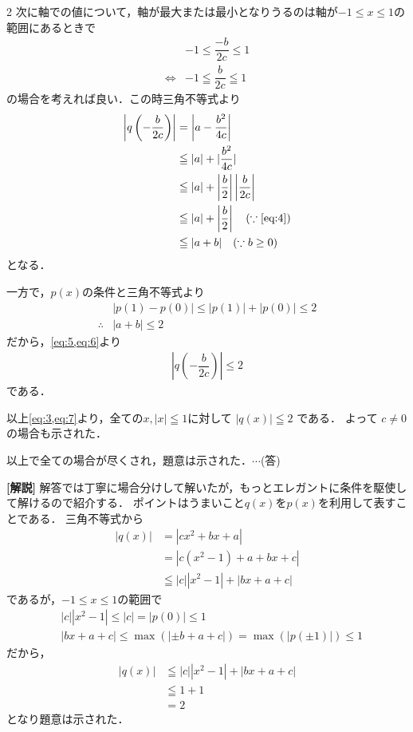 \documentclass[../../main.tex]{subfiles}
\begin{document}
\begin{multicols}{2}
  次に軸での値について，軸が最大または最小となりうるのは軸が$-1\le x\le 1$の範囲にあるときで
  \begin{align}
    & -1 \le \dfrac{-b}{2c} \le 1                        \\
    \iff
    & -1 \leqq \dfrac{b}{2c} \leqq 1 \label{eq:4}
  \end{align}
  の場合を考えれば良い．この時三角不等式より
  \begin{align}
    \left|q\left(-\dfrac{b}{2c}\right)\right|
    & = \left|a-\dfrac{b^2}{4c}\right|                                                 \\
    & \leqq |a| + |\dfrac{b^2}{4c}|                                                    \\
    & \leqq |a| + \left|\dfrac{b}{2}\right|\left|\dfrac{b}{2c}\right|                   \\
    & \leqq |a| + \left|\dfrac{b}{2}\right| \quad (\because \text{\cref{eq:4}}) \\
    & \leqq |a+b| \quad (\because b \ge 0) \label{eq:5}
  \end{align}
  となる．

  一方で，$p(x)$の条件と三角不等式より
  \begin{align}
    & |p(1)-p(0)| \le |p(1)| + |p(0)| \le 2 \\
    \therefore
    & |a+b| \le 2 \label{eq:6}
  \end{align}
  だから，\cref{eq:5,eq:6}より
  \begin{align}
    \left|q\left(-\dfrac{b}{2c}\right)\right| \le 2 \label{eq:7}
  \end{align}
  である．

  以上\cref{eq:3,eq:7}より，全ての$x, |x|\leqq 1$に対して
  $|q(x)| \leqq 2$ である．
  よって $c \neq 0$ の場合も示された．

  以上で全ての場合が尽くされ，題意は示された．$\cdots$(答)

  {\bf [解説]}
  解答では丁寧に場合分けして解いたが，もっとエレガントに条件を駆使して解けるので紹介する．
  ポイントはうまいこと$q(x)$を$p(x)$を利用して表すことである．
  三角不等式から
  \begin{align}
    |q(x)|
    & = |cx^2+bx+a|               \\
    & = |c(x^2-1) + a+bx+c|       \\
    & \leqq |c||x^2-1| + |bx+a+c|
  \end{align}
  であるが，$-1\le x \le 1$の範囲で
  \begin{align}
    & |c||x^2-1| \le |c| = |p(0)| \le 1           \\
    & |bx+a+c| \le \max(|\pm b+a+c|) = \max(|p(\pm 1)|) \le 1
  \end{align}
  だから，
  \begin{align}
    |q(x)|
    & \leqq |c||x^2-1| + |bx+a+c| \\
    & \leqq 1 + 1                 \\
    & = 2
  \end{align}
  となり題意は示された．

  \newpage
\end{multicols}
\end{document}
